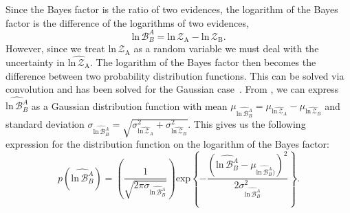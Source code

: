 Since the Bayes factor is the ratio of two evidences, the logarithm of the Bayes factor is the difference of the logarithms of two evidences,
\begin{equation}\label{eqn:log_bayes_factor}
    \mathrm{ln} \, \mathcal{B}^A_B = \mathrm{ln} \, \mathcal{Z}_{\mathrm{A}} - \mathrm{ln} \, \mathcal{Z}_{\mathrm{B}}.
\end{equation}
However, since we treat $\mathrm{ln} \, \mathcal{Z}_{\mathrm{A}}$ as a random variable we must deal with the uncertainty in $\widehat{\mathrm{ln} \, \mathcal{Z}_{\mathrm{A}}}$. The logarithm of the Bayes factor then becomes the difference between two probability distribution functions. This can be solved via convolution and has been solved for the Gaussian case~\citep{bromiley2003products}. From \cite{bromiley2003products}, we can express $\widehat{\mathrm{ln} \, \mathcal{B}^A_B}$ as a Gaussian distribution function with mean $\mu_{\widehat{\mathrm{ln} \, \mathcal{B}^A_B}} = \mu_{\widehat{\mathrm{ln} \, \mathcal{Z}_A}} - \mu_{\widehat{\mathrm{ln} \, \mathcal{Z}_B}}$ and standard deviation $\sigma_{\widehat{\mathrm{ln} \, \mathcal{B}^A_B}} = \sqrt{\sigma_{\widehat{\mathrm{ln} \, \mathcal{Z}_A}}^2 + \sigma_{\widehat{\mathrm{ln} \, \mathcal{Z}_B}}^2 }$. This gives us the following expression for the distribution function on the logarithm of the Bayes factor:
\begin{equation}\label{eqn:p_log_b}
    p(\widehat{\mathrm{ln} \, \mathcal{B}^A_B}) = \left(\frac{1}{\sqrt{2 \pi \sigma_{\widehat{\mathrm{ln} \, \mathcal{B}^A_B}}}} \right) \mathrm{exp} \left \{-\frac{\left(\widehat{\mathrm{ln} \, \mathcal{B}^A_B} - \mu_{\widehat{\mathrm{ln} \, \mathcal{B}^A_B})}\right)^2} {2 \sigma^2_{\widehat{\mathrm{ln} \, \mathcal{B}^A_B}}}  \right\}.
\end{equation}


